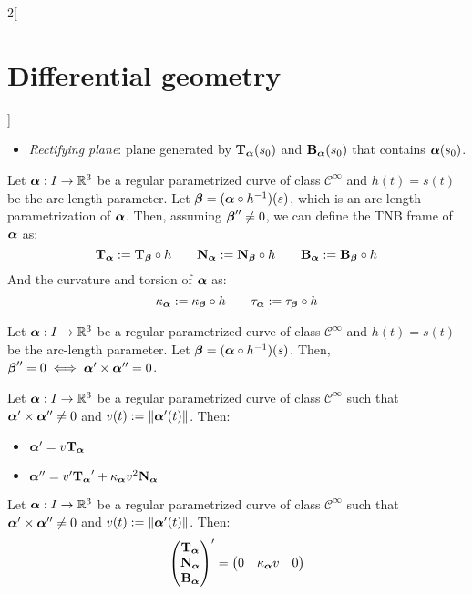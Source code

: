 \documentclass[../../../main.tex]{subfiles}
\begin{document}
\begin{multicols}{2}[\section{Differential geometry}]
\begin{definition}
\begin{itemize}
      \item \emph{Rectifying plane}: plane generated by $\T\alpha(s_0)$ and $\B\alpha(s_0)$ that contains $\vf{\alpha}(s_0)$.
    \end{itemize}
  \end{definition}
  \begin{proposition}
    Let $\vf{\alpha}:I\rightarrow\RR^3$ be a regular parametrized curve of class $\mathcal{C}^\infty$ and $h(t)=s(t)$ be the arc-length parameter. Let $\vf{\beta}=(\vf{\alpha}\circ h^{-1})(s)$, which is an arc-length parametrization of $\vf{\alpha}$. Then, assuming $\vf{\beta}''\ne 0$, we can define the TNB frame of $\vf{\alpha}$ as: $$\T\alpha:=\T\beta\circ h\qquad\N\alpha:=\N\beta\circ h\qquad\B\alpha:=\B\beta\circ h$$
    And the curvature and torsion of $\vf\alpha$ as: $$\ka\alpha:=\ka\beta\circ h\qquad\ta\alpha:=\ta\beta\circ h$$
  \end{proposition}
  \begin{lemma}
    Let $\vf{\alpha}:I\rightarrow\RR^3$ be a regular parametrized curve of class $\mathcal{C}^\infty$ and $h(t)=s(t)$ be the arc-length parameter. Let $\vf{\beta}=(\vf{\alpha}\circ h^{-1})(s)$. Then, $\vf{\beta}''=0\iff\vf\alpha'\times\vf\alpha''=0$.
  \end{lemma}
  \begin{proposition}
    Let $\vf{\alpha}:I\rightarrow\RR^3$ be a regular parametrized curve of class $\mathcal{C}^\infty$ such that $\vf{\alpha}'\times \vf{\alpha}''\ne 0$ and $v(t):=\|\vf{\alpha}'(t)\|$. Then:
    \begin{itemize}
      \item $\vf{\alpha}'=v\T\alpha$
      \item $\vf{\alpha}''=v'\T\alpha'+\ka\alpha v^2\N\alpha$
    \end{itemize}
  \end{proposition}
  \begin{theorem}
    Let $\vf{\alpha}:I\rightarrow\RR^3$ be a regular parametrized curve of class $\mathcal{C}^\infty$ such that $\vf{\alpha}'\times \vf{\alpha}''\ne 0$ and $v(t):=\|\vf{\alpha}'(t)\|$. Then:
    $$
      \begin{pmatrix}
        \T\alpha \\
        \N\alpha \\
        \B\alpha \\
      \end{pmatrix}'=
      \begin{pmatrix}
        0            & \ka\alpha v & 0            \\

\end{pmatrix}$$
\end{theorem}
\end{multicols}
\end{document}
